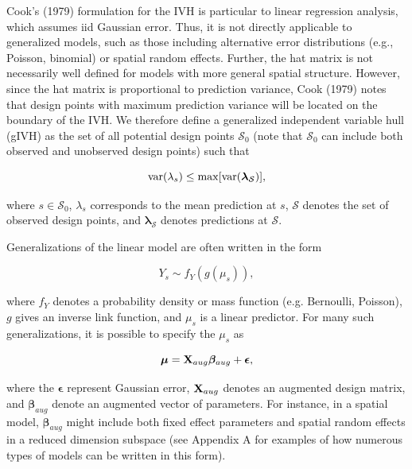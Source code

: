 \documentclass[12pt,english]{article}
\begin{document}
\begin{spacing}{1.9}
Cook's (1979) formulation for the IVH is particular to linear regression analysis, which assumes iid Gaussian error. Thus, it is not directly applicable to generalized models, such as those including alternative error distributions (e.g., Poisson, binomial) or spatial random effects.  Further, the hat matrix is not necessarily well defined for models with more general spatial structure. However, since the hat matrix is proportional to prediction variance, Cook (1979) notes that design points with maximum prediction variance will be located on the boundary of the IVH.  We therefore define a generalized independent variable hull (gIVH) as the set of all potential design points $\mathcal{S}_0$ (note that $\mathcal{S}_0$ can include both observed and unobserved design points) such that
\begin{linenomath*}
\begin{equation}
  \label{eq:gIVH}
  {\rm var}(\lambda_s) \le {\rm max} [{\rm var}(\boldsymbol{\lambda}_{\mathcal{S}})],
\end{equation}
\end{linenomath*}
where $s \in \mathcal{S}_0$, $\lambda_s$ corresponds to the mean prediction at $s$, $\mathcal{S}$ denotes the set of observed design points, and $\boldsymbol{\lambda}_\mathcal{S}$ denotes predictions at $\mathcal{S}$.

Generalizations of the linear model are often written in the form
\begin{linenomath*}
\begin{equation}
  Y_s \sim f_Y(g(\mu_s)),
\end{equation}
\end{linenomath*}
where $f_Y$ denotes a probability density or mass function (e.g. Bernoulli, Poisson), $g$ gives an inverse link function, and
$\mu_s$ is a linear predictor.  For many such generalizations, it is possible to specify the $\mu_s$ as
\begin{linenomath*}
\begin{equation}
  \boldsymbol{\mu} = {\bf X}_{aug}\boldsymbol{\beta}_{aug} + \boldsymbol{\epsilon},
  \label{eq:mu-aug}
\end{equation}
\end{linenomath*}
where the $\boldsymbol{\epsilon}$ represent Gaussian error, ${\bf X}_{aug}$ denotes an augmented design matrix, and $\boldsymbol{\beta}_{aug}$ denote an augmented vector of parameters.  For instance, in a spatial model, $\boldsymbol{\beta}_{aug}$ might include both fixed effect parameters and spatial random effects in a reduced dimension subspace (see Appendix A for examples of how numerous types of models can be written in this form).


\end{spacing}
\end{document}
